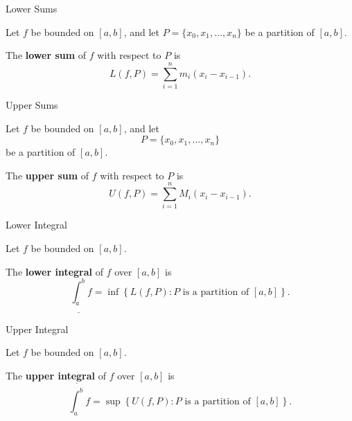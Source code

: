 \documentclass[12pt,a4paper]{article}
\begin{document}
\FrontPage
\Large

\begin{heading}
Lower Sums
\end{heading}

\begin{definition}
Let $f$ be bounded on $[a,b]$, and let
\(
P=\{x_0,x_1,\dots,x_n\}
\)
be a partition of $[a,b]$.

The \textbf{lower sum} of $f$ with respect to $P$ is
\[
L(f,P)
=
\sum_{i=1}^{n}
m_i(x_i-x_{i-1}).
\]
\end{definition}



\clearpage

\begin{heading}
Upper Sums
\end{heading}

\begin{definition}
Let $f$ be bounded on $[a,b]$, and let
\[
P=\{x_0,x_1,\dots,x_n\}
\]
be a partition of $[a,b]$.

The \textbf{upper sum} of $f$ with respect to $P$ is
\[
U(f,P)
=
\sum_{i=1}^{n}
M_i(x_i-x_{i-1}).
\]
\end{definition}

\clearpage

\begin{heading}
Lower Integral
\end{heading}

\begin{definition}
Let $f$ be bounded on $[a,b]$.

The \textbf{lower integral} of $f$ over $[a,b]$ is
\[
\underline{\int_a^b} f
=
\inf
\left\{
L(f,P):
P\text{ is a partition of }[a,b]
\right\}.
\]
\end{definition}

\clearpage

\begin{heading}
Upper Integral
\end{heading}

\begin{definition}
Let $f$ be bounded on $[a,b]$.

The \textbf{upper integral} of $f$ over $[a,b]$ is
\[
\overline{\int_a^b} f
=
\sup
\left\{
U(f,P):
P\text{ is a partition of }[a,b]
\right\}.
\]
\end{definition}
\end{document}
